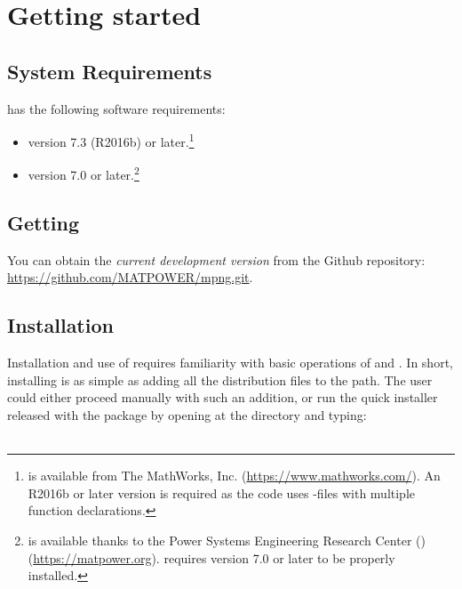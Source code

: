 \chapter{Getting started}
\label{chap:get_started}

\section{System Requirements}
\label{sec:requirements}

\mpng{} has the following software requirements:

\begin{itemize}
	\item[\checkmark] \matlab{}\textsuperscript{\tiny \textregistered} version 7.3 (R2016b) or later.\footnote{\matlab{} is available from The MathWorks, Inc. (\url{https://www.mathworks.com/}). An R2016b or later \matlab{} version is required as the \mpng{} code uses \matlab{}-files with multiple function declarations.}
	
	\item[\checkmark] \matpower{} version 7.0 or later.\footnote{\matpower{} is available thanks to the Power Systems Engineering Research Center (\pserc) (\url{https://matpower.org}). \mpng{} requires \matpower{} version 7.0 or later to be properly installed.}
\end{itemize}

\section{Getting \mpng{}}
\label{sec:get_mpng}

You can obtain the \emph{current development version} from the \matpower{} Github repository: \url{https://github.com/MATPOWER/mpng.git}.

\section{Installation}
\label{sec:install}

Installation and use of \mpng{} requires familiarity with basic operations of \matlab{} and \matpower{}. In short, installing \mpng{} is as simple as adding all the distribution files to the \matlab{} path. The user could either proceed manually with such an addition, or run the quick installer released with the package by opening \matlab{} at the \mpngpath{} directory and typing:\\

\\


